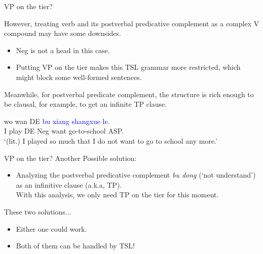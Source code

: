\documentclass[professionalfonts, xcolor={usenames,svgnames,x11names,table}]{beamer}
\begin{document}
  
  \begin{frame}{VP on the tier?}
  
\textcolor{cadmiumgreen}{However, treating verb and its postverbal predicative complement as a complex V compound may have some downsides.}


\begin{itemize}
\pause
\item Neg is not a head in this case.
\pause
\item Putting VP on the tier makes this TSL grammar more restricted, which might block some well-formed sentences.  

\end{itemize}

\pause
\textcolor{cadmiumgreen}{Meanwhile, for postverbal predicate complement, the structure is rich enough to be clausal, for example, to get an infinite TP clause.} \\
\pause
\begin{exe}
\ex \gll wo  wan  DE  \textcolor{blue}{bu}  \textcolor{blue}{xiang}  \textcolor{blue}{shangxue}   \textcolor{blue}{le}. \\
            I  play  DE  Neg  want  go-to-school  ASP. \\
                \glt `(lit.) I played so much that I do not want to go to school any more.'
\end{exe}

\end{frame}




  \begin{frame}{VP on the tier?}
Another Possible solution:\\
\begin{itemize}
\item Analyzing the postverbal predicative complement \textit{bu dong} (`not understand')  as an infinitive clause (a.k.a, TP). \\
With this analysis, we only need TP on the tier for this moment. 
\end{itemize}
\pause

\begin{alertblock}{These two solutions...}
\begin{itemize}
\item Either one could work. 
\item Both of them can be handled by TSL!
\end{itemize}
\end{alertblock}
 \end{frame}
\end{document}
